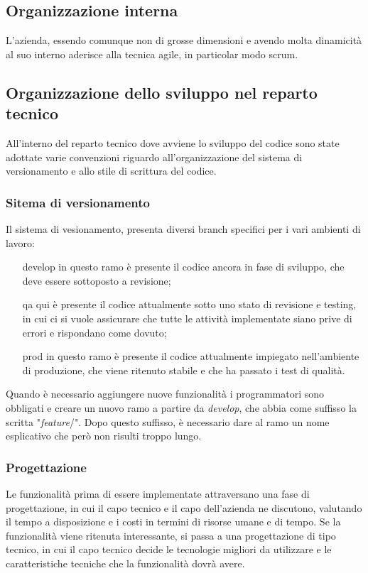 \subsection{Organizzazione interna}

L'azienda, essendo comunque non di grosse dimensioni e avendo molta dinamicità
al suo interno aderisce alla tecnica \gls{agile}, in particolar modo
\gls{scrum}.

\subsection{Organizzazione dello sviluppo nel reparto tecnico}
\label{intro:OrganizzazioneSviluppoRepartoTecnico}

All'interno del reparto tecnico dove avviene lo sviluppo del codice sono state
adottate varie convenzioni riguardo all'organizzazione del sistema di
versionamento e allo stile di scrittura del codice.

\subsubsection{Sitema di versionamento}

Il sistema di vesionamento, presenta diversi branch specifici per i vari
ambienti di lavoro:
\begin{itemize}

\item[develop] in questo ramo è presente il codice ancora in fase di sviluppo,
che deve essere sottoposto a revisione;
\item[qa] qui è presente il codice attualmente sotto uno stato di revisione e
testing, in cui ci si vuole assicurare che tutte le attività implementate siano
prive di errori e rispondano come dovuto;
\item[prod] in questo ramo è presente il codice attualmente impiegato
nell'ambiente di produzione, che viene ritenuto stabile e che ha passato i test
di qualità.
\end{itemize}

Quando è necessario aggiungere nuove funzionalità i programmatori sono
obbligati e creare un nuovo ramo a partire da \textit{develop}, che abbia come
suffisso la scritta "\textit{feature}/". Dopo questo suffisso, è necessario dare
al ramo un nome esplicativo che però non risulti troppo lungo.

\subsubsection{Progettazione}
Le funzionalità prima di essere implementate attraversano una fase di
progettazione, in cui il capo tecnico e il capo dell'azienda ne discutono,
valutando il tempo a disposizione e i costi in termini di risorse umane e di
tempo. Se la funzionalità viene ritenuta interessante, si passa a una
progettazione di tipo tecnico, in cui il capo tecnico decide le tecnologie
migliori da utilizzare e le caratteristiche tecniche che la funzionalità dovrà
avere.

